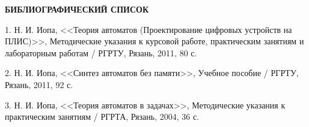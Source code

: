 
\newpage

\begin{center}
\textbf{БИБЛИОГРАФИЧЕСКИЙ СПИСОК}
\end{center}

1.  Н. И. Иопа, <<Теория автоматов (Проектирование цифровых устройств на ПЛИС)>>, Методические указания к курсовой работе, практическим занятиям и лабораторным работам / РГРТУ, Рязань, 2011, 80 с.

2. Н. И. Иопа, <<Синтез автоматов без памяти>>, Учебное пособие / РГРТУ, Рязань, 2011, 92 с.

3. Н. И. Иопа, <<Теория автоматов в задачах>>, Методические указания к практическим занятиям / РГРТА, Рязань, 2004, 36 с.
